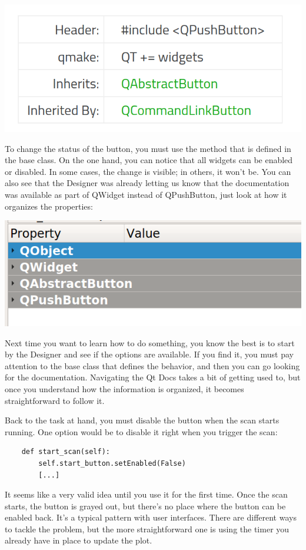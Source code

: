 \begin{center}
    \includegraphics[width=.4\linewidth]{images/Chapter_09/11_Qt_Docs_inheritance.png}
\end{center}

To change the status of the button, you must use the  method that is defined in the base  class. On the one hand, you can notice that all widgets can be enabled or disabled. In some cases, the change is visible; in others, it won't be. You can also see that the Designer was already letting us know that the documentation was available as part of QWidget instead of QPushButton, just look at how it organizes the properties:

\begin{center}
    \includegraphics[width=.4\linewidth]{images/Chapter_09/12_Designer_object_inheritance.png}
\end{center}

Next time you want to learn how to do something, you know the best is to start by the Designer and see if the options are available. If you find it, you must pay attention to the base class that defines the behavior, and then you can go looking for the documentation. Navigating the Qt Docs takes a bit of getting used to, but once you understand how the information is organized, it becomes straightforward to follow it.

Back to the task at hand, you must disable the button when the scan starts running. One option would be to disable it right when you trigger the scan:

\begin{verbatim}
    def start_scan(self):
        self.start_button.setEnabled(False)
        [...]
\end{verbatim}

It seems like a very valid idea until you use it for the first time. Once the scan starts, the button is grayed out, but there's no place where the button can be enabled back. It's a typical pattern with user interfaces. There are different ways to tackle the problem, but the more straightforward one is using the timer you already have in place to update the plot.

